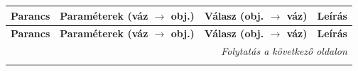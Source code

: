 \begin{longtable}{|c|p{3.5cm}|p{3.5cm}|p{5cm}|}
    \hline
    \rowcolor{lightgray}
    \textbf{Parancs} & 
    \textbf{Paraméterek (váz $\rightarrow$ obj.)} & 
    \textbf{Válasz (obj. $\rightarrow$ váz)} & 
    \textbf{Leírás} \\
    \hline
    \endfirsthead
    
    \hline
    \rowcolor{lightgray}
    \textbf{Parancs} & 
    \textbf{Paraméterek (váz $\rightarrow$ obj.)} & 
    \textbf{Válasz (obj. $\rightarrow$ váz)} & 
    \textbf{Leírás} \\
    \hline
    \endhead
    
    \hline
    \multicolumn{4}{r}{\textit{Folytatás a következő oldalon}} \\
    \endfoot
    
    \endlastfoot
    

\end{longtable}
